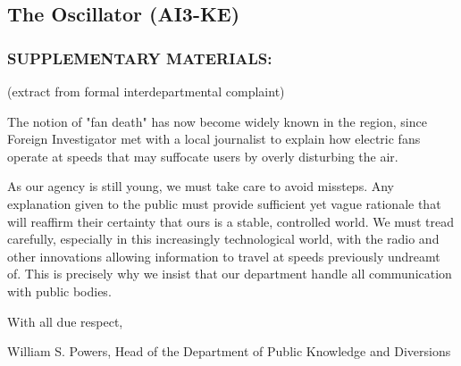 \subsection*{The Oscillator (AI3-KE)}
\subsubsection*{SUPPLEMENTARY MATERIALS:}
\par (extract from formal interdepartmental complaint)
\par The notion of "fan death" has now become widely known in the
region, since Foreign Investigator  met with a local journalist to explain how electric fans operate at speeds that may
suffocate users by overly disturbing the air.
\par As our agency is still young, we must take care to avoid missteps.
Any explanation given to the public must provide sufficient yet
vague rationale that will reaffirm their certainty that ours is a
stable, controlled world. We must tread carefully, especially in this
increasingly technological world, with the radio and other
innovations allowing information to travel at speeds previously
undreamt of. This is precisely why we insist that our department
handle all communication with public bodies.
\par With all due respect,
\par William S. Powers, Head of the Department of Public Knowledge
and Diversions